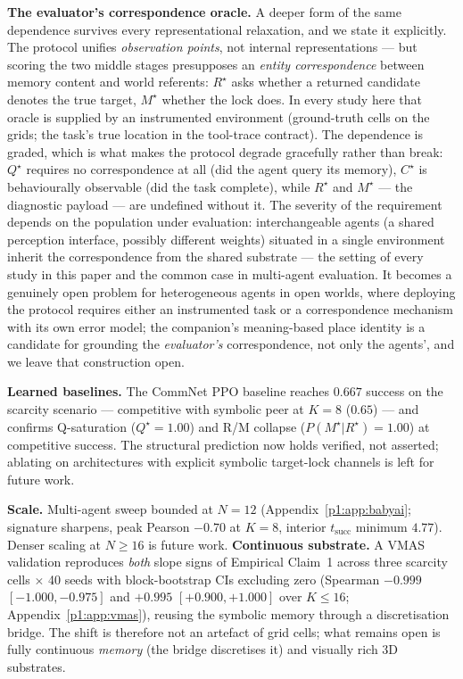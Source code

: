 \documentclass{article}
\begin{document}
\textbf{The evaluator's correspondence oracle.} A deeper form of the
same dependence survives every representational relaxation, and we
state it explicitly. The protocol unifies \emph{observation points},
not internal representations --- but scoring the two middle stages
presupposes an \emph{entity correspondence} between memory content and
world referents: $R^\star$ asks whether a returned candidate denotes
the true target, $M^\star$ whether the lock does. In every study here
that oracle is supplied by an instrumented environment (ground-truth
cells on the grids; the task's true location in the tool-trace
contract). The dependence is graded, which is what makes the protocol
degrade gracefully rather than break: $Q^\star$ requires no
correspondence at all (did the agent query its memory), $C^\star$ is
behaviourally observable (did the task complete), while $R^\star$ and
$M^\star$ --- the diagnostic payload --- are undefined
without it. The severity of the requirement depends on the population
under evaluation: interchangeable agents (a shared perception
interface, possibly different weights) situated in a single
environment inherit the correspondence from the shared substrate ---
the setting of every study in this paper and the common case in
multi-agent evaluation. It becomes a genuinely open problem for
heterogeneous agents in open worlds, where deploying the protocol
requires either an instrumented task or a correspondence mechanism
with its own error model; the companion's meaning-based place identity
is a candidate for grounding the \emph{evaluator's} correspondence,
not only the agents', and we leave that construction open.

\textbf{Learned baselines.} The CommNet PPO baseline reaches $0.667$ success on the scarcity scenario --- competitive with symbolic peer at $K{=}8$ ($0.65$) --- and confirms Q-saturation ($Q^\star{=}1.00$) and R/M collapse ($P(M^\star|R^\star){=}1.00$) at competitive success. The structural prediction now holds verified, not asserted; ablating on architectures with explicit symbolic target-lock channels is left for future work.

\textbf{Scale.} Multi-agent sweep bounded at $N{=}12$ (Appendix~\ref{p1:app:babyai}; signature sharpens, peak Pearson $-0.70$ at $K{=}8$, interior $t_{\mathrm{succ}}$ minimum $4.77$). Denser scaling at $N{\ge}16$ is future work.
\textbf{Continuous substrate.} A VMAS~\citep{bettini2022vmas} validation reproduces \emph{both} slope signs of Empirical Claim~1 across three scarcity cells $\times$ 40 seeds with block-bootstrap CIs excluding zero (Spearman $-0.999$ $[-1.000,-0.975]$ and $+0.995$ $[+0.900,+1.000]$ over $K{\le}16$; Appendix~\ref{p1:app:vmas}), reusing the symbolic memory through a discretisation bridge. The shift is therefore not an artefact of grid cells; what remains open is fully continuous \emph{memory} (the bridge discretises it) and visually rich 3D substrates.
\end{document}
